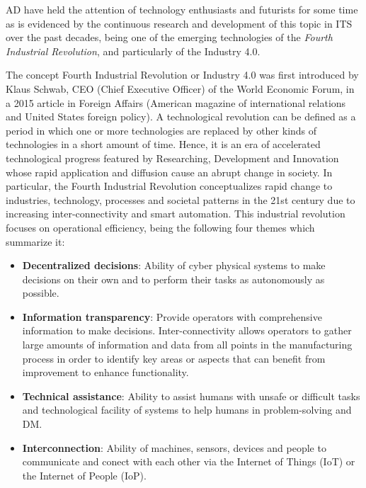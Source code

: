 \ac{AD} have held the attention of technology enthusiasts and futurists for some time as is evidenced by the continuous research and development of this topic in \ac{ITS} over the past decades, being one of the emerging technologies of the \textit{Fourth Industrial Revolution}, and particularly of the Industry 4.0. 

The concept Fourth Industrial Revolution or Industry 4.0  was first introduced by Klaus Schwab, CEO (Chief Executive Officer) of the World Economic Forum, in a 2015 article in Foreign Affairs (American magazine of international relations and United States foreign policy). A technological revolution can be defined as a period in which one or more technologies are replaced by other kinds of technologies in a short amount of time. Hence, it is an era of accelerated technological progress featured by Researching, Development and Innovation whose rapid application and diffusion cause an abrupt change in society. In particular, the Fourth Industrial Revolution conceptualizes rapid change to industries, technology, processes and societal patterns in the 21st century due to increasing inter-connectivity and smart automation. This industrial revolution focuses on operational efficiency, being the following four themes which summarize it: 

\begin{itemize}
	
	\item \textbf{Decentralized decisions}: Ability of cyber physical systems to make decisions on their own and to perform their tasks as autonomously as possible.
	
	\item \textbf{Information transparency}: Provide operators with comprehensive information to make decisions. Inter-connectivity allows operators to gather large amounts of information and data from all points in the manufacturing process in order to identify key areas or aspects that can benefit from improvement to enhance functionality.
	
	\item \textbf{Technical assistance}: Ability to assist humans with unsafe or difficult tasks and technological facility of systems to help humans in problem-solving and \ac{DM}.
	
	\item \textbf{Interconnection}: Ability of machines, sensors, devices and people to communicate and conect with each other via the Internet of Things (IoT) or the Internet of People (IoP).
	
\end{itemize}

